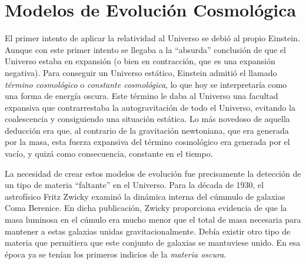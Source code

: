 \documentclass[a4paper,openright,10pt, oneside, final]{book}
\begin{document}
\section{Modelos de Evolución Cosmológica}
El primer intento de aplicar la relatividad al Universo se debió al propio Einstein. Aunque con este primer intento se llegaba a la ``absurda'' conclusión de que el Universo estaba en expansión (o bien en contracción, que es una expansión negativa). Para conseguir un Universo estático, Einstein admitió el llamado \textit{término cosmológico} o \textit{constante cosmológica}, lo que hoy se interpretaría como una forma de energía oscura. Este término le daba al Universo una facultad expansiva que contrarrestaba la autogravitación de todo el Universo, evitando la coalescencia y consiguiendo una situación estática. Lo más novedoso de aquella deducción era que, al contrario de la gravitación newtoniana, que era generada por la masa, esta fuerza expansiva del término cosmológico era generada por el vacío, y quizá como consecuencia, constante en el tiempo.

La necesidad de crear estos modelos de evolución fue precisamente la detección de un tipo de materia ``faltante'' en el Universo. Para la década de 1930, el astrofísico Fritz Zwicky \cite{1.1.1} examinó la dinámica interna del cúmmulo de galaxias Coma Berenice. En dicha publicación, Zwicky proporciona evidencia de que la masa luminosa en el cúmulo era mucho menor que el total de masa  necesaria para mantener a estas galaxias unidas gravitacionalmente. Debía existir otro tipo de materia que permitiera que este conjunto de galaxias se mantuviese unido. En esa época ya se tenían los primeros indicios de la \textit{materia oscura}.
\end{document}
